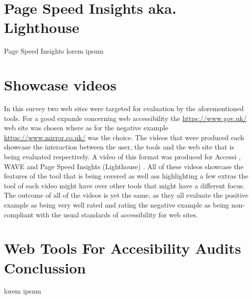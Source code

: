 \section{Page Speed Insights aka. Lighthouse}

Page Speed Insights \parencite{PSIL}
lorem ipsum


\section{Showcase videos}
In this survey two web sites were targeted for evaluation by the aforementioned tools. For a good expamle concerning web accessibility the \url{https://www.gov.uk/} web site was chosen where as for the negative example \url{https://www.mirror.co.uk/} was the choice. The videos that were produced each showcase the interaction between the user, the tools and the web site that is being evaluated respectively. A video of this format was produced for Accessi \parencite{Accessi_vid}, WAVE \parencite{WAVE_vid} and Page Speed Insights (Lighthouse) \parencite{PageSpeedInsights_vid}. All of these videos showcase the features of the tool that is being covered as well ass highlighting a few extras the tool of each video might have over other tools that might have a different focus. The outcome of all of the videos is yet the same, as they all evaluate the positive example as being very well rated and rating the negative example as being non-compliant with the usual standards of accessibility for web sites.

\section{Web Tools For Accesibility Audits Conclussion}

lorem ipsum


